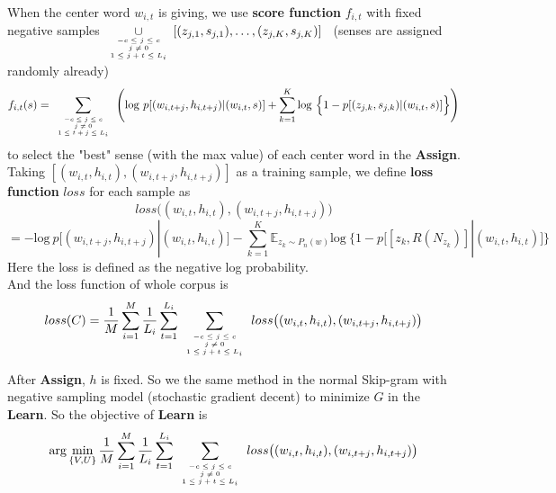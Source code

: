 When the center word $w_{i,t}$ is giving, we use \textbf{score function} $f_{i,t}$ with fixed negative samples $\displaystyle{\mathop{\cup}_{\mbox{\tiny$\begin{array}{c}-c\leq j \leq c\\ j\neq 0\\ 1\leq j+t\leq L_i\end{array}$}}}[(z_{j,1},s_{j,1}),\ldots,(z_{j,K},s_{j,K})]$ \ (senses are assigned randomly already)
$$f_{i,t}(s) = \sum\limits_{\mbox{\tiny$\begin{array}{c}-c\leq j \leq c\\ j\neq 0\\ 1\leq t+j\leq L_i\end{array}$}}\Bigg (\mathrm{log}\ p[(w_{i,t+j},h_{i,t+j})|(w_{i,t},s) ]+\sum\limits_{k=1}^K\mathrm{log}\ \Big \{1-p[(z_{j,k},s_{j,k})|(w_{i,t},s)] \Big \} \Bigg )$$ 
to select the "best" sense (with the max value) of each center word in the \textbf{Assign}. \\

Taking $[ (w_{i,t},h_{i,t}),(w_{i,t+j},h_{i,t+j})]$ as a training sample, we define \textbf{loss function} $loss$ for each sample as
$$loss\big ( (w_{i,t},h_{i,t}),(w_{i,t+j},h_{i,t+j})\big )$$
$$ = -\mathrm{log}\ p\Big [(w_{i,t+j},h_{i,t+j})|(w_{i,t},h_{i,t})\Big ]-\sum\limits_{k=1}^K\mathbb{E}_{z_k\sim P_n(w)}\mathrm{log}\ \Big \{1-p\Big[[z_k,R(N_{z_k})]|(w_{i,t},h_{i,t})\Big ] \Big \}$$
Here the loss is defined as the negative log probability. \\

And the loss function of whole corpus is $$loss(C)=\frac{1}{M}\sum_{i=1}^M\frac{1}{L_i}\sum_{t=1}^{L_i}\sum\limits_{\mbox{\tiny$\begin{array}{c}-c\leq j \leq c\\ j\neq 0\\ 1\leq j+t\leq L_i\end{array}$}}loss\big ( (w_{i,t},h_{i,t}),(w_{i,t+j},h_{i,t+j})\big )$$

	After \textbf{Assign}, $h$ is fixed. So we the same method in the normal Skip-gram with negative sampling model (stochastic gradient decent) to minimize $G$ in the \textbf{Learn}. So the objective of \textbf{Learn} is 
	$$\arg\min_{\{V,U\}} \frac{1}{M}\sum_{i=1}^M\frac{1}{L_i}\sum_{t=1}^{L_i}\sum\limits_{\mbox{\tiny$\begin{array}{c}-c\leq j \leq c\\ j\neq 0\\ 1\leq j+t\leq L_i\end{array}$}}loss\big ( (w_{i,t},h_{i,t}),(w_{i,t+j},h_{i,t+j})\big )$$
	
